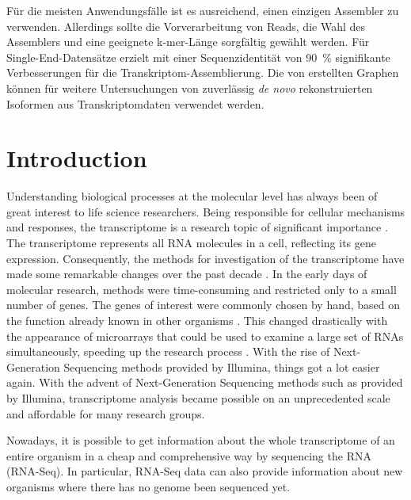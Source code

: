 \documentclass[12pt,a4paper,english]{article}
\begin{document}
	Für die meisten Anwendungsfälle ist es ausreichend, einen einzigen Assembler zu verwenden. Allerdings sollte die Vorverarbeitung von Reads, die Wahl des Assemblers und eine geeignete k-mer-Länge sorgfältig gewählt werden. Für Single-End-Datensätze erzielt \cdhit mit einer Sequenzidentität von 90~\% signifikante Verbesserungen für die Transkriptom-Assemblierung.
	Die von \karma erstellten Graphen können für weitere Untersuchungen von zuverlässig \textit{de novo} rekonstruierten Isoformen aus Transkriptomdaten verwendet werden.
	

\newpage
\pagestyle{empty}
\tableofcontents

\newpage
\pagestyle{fancy}
\renewcommand{\sectionmark}[1]{\markright{#1}}
\section{Introduction}
    Understanding biological processes at the molecular level has always been of great interest to life science researchers.
    Being responsible for cellular mechanisms and responses, the transcriptome is a research topic of significant importance \citep{rnaseq:09}.
	The transcriptome represents all RNA molecules in a cell, reflecting its gene expression. Consequently, the methods for investigation of the transcriptome have made some remarkable changes over the past decade \citep{rev_rnaseq:17}. In the early days of molecular research, methods were time-consuming and restricted only to a small number of genes. The genes of interest were commonly chosen by hand, based on the function already known in other organisms \citep{Fitzpatrick:05}.
	This changed drastically with the appearance of microarrays that could be used to examine a large set of RNAs simultaneously, speeding up the research process \citep{Bhargava:13, Tarca:06}. With the rise of Next-Generation Sequencing methods provided by Illumina, things got a lot easier again.
	With the advent of Next-Generation Sequencing methods such as provided by Illumina, transcriptome analysis became possible on an unprecedented scale and affordable for many research groups.
	
	Nowadays, it is possible to get information about the whole transcriptome of an entire organism in a cheap and comprehensive way by sequencing the RNA (RNA-Seq). In particular, RNA-Seq data can also provide information about new organisms where there has no genome been sequenced yet.
	
\end{document}

